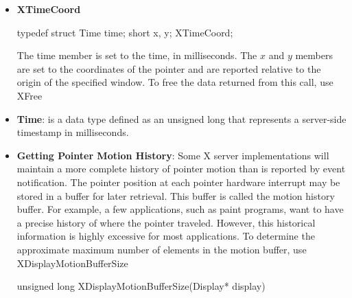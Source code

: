 \documentclass{report}
\begin{document}
\begin{itemize}
\begin{itemize}
            \end{itemize}
            The event in the XEvent structure must be one of the core events or one of the events defined by an extension (or a BadValue error results) so that the X server can correctly byte-swap the contents as necessary. The contents of the event are otherwise unaltered and unchecked by the X server except to force send\_event to True in the forwarded event and to set the serial number in the event correctly; therefore these fields and the display field are ignored by XSendEvent
            \bigbreak \noindent 
            XSendEvent returns zero if the conversion to wire protocol format failed and returns nonzero otherwise.
            \bigbreak \noindent 
            XSendEvent can generate BadValue and BadWindow errors.
        \item \textbf{XTimeCoord}
            \bigbreak \noindent 
            \begin{cppcode}
                typedef struct {
                    Time time;
                    short x, y;
                } XTimeCoord;
            \end{cppcode}
            \bigbreak \noindent 
            The time member is set to the time, in milliseconds. The $x$ and $y$ members are set to the coordinates of the pointer and are reported relative to the origin of the specified window. To free the data returned from this call, use XFree
        \item \textbf{Time}: is a data type defined as an unsigned long that represents a server-side timestamp in milliseconds. 
        \item \textbf{Getting Pointer Motion History}: Some X server implementations will maintain a more complete history of pointer motion than is reported by event notification. The pointer position at each pointer hardware interrupt may be stored in a buffer for later retrieval. This buffer is called the motion history buffer. For example, a few applications, such as paint programs, want to have a precise history of where the pointer traveled. However, this historical information is highly excessive for most applications.
            \bigbreak \noindent 
            To determine the approximate maximum number of elements in the motion buffer, use XDisplayMotionBufferSize
            \bigbreak \noindent 
            \begin{cppcode}
            unsigned long XDisplayMotionBufferSize(Display* display)
            \end{cppcode}
            \bigbreak \noindent 

\end{itemize}
\end{document}
